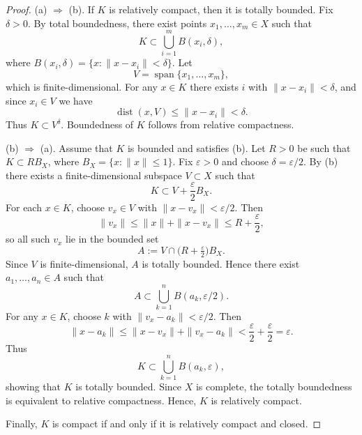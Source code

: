 \documentclass[12pt]{article}
\renewcommand{\(}{\left(}%
\renewcommand{\)}{\right)}%
\renewcommand{\[}{\left[}%
\renewcommand{\]}{\right]}%
\newtheorem{proof}{Proof.}}
\begin{document}
\begin{proof}
(a) $\Rightarrow$ (b).
If $K$ is relatively compact, then it is totally bounded.
Fix $\delta>0$. By total boundedness, there exist points
$x_1,\dots,x_m\in X$ such that
\begin{equation*}
  K \subset \bigcup_{i=1}^m B(x_i,\delta),
\end{equation*}
where $B(x_i,\delta)=\{x:\|x-x_i\|<\delta\}$.
Let
\begin{equation*}
  V = \operatorname{span}\{x_1,\dots,x_m\},
\end{equation*}
which is finite-dimensional.
For any $x\in K$ there exists $i$ with $\|x-x_i\|<\delta$, and since $x_i\in V$ we have
\begin{equation*}
  \operatorname{dist}(x,V)\le \|x-x_i\|<\delta.
\end{equation*}
Thus $K\subset V^\delta$. Boundedness of $K$ follows from relative compactness.

\medskip
(b) $\Rightarrow$ (a).
Assume that $K$ is bounded and satisfies (b).
Let $R>0$ be such that $K\subset RB_X$, where $B_X=\{x:\|x\|\le1\}$.
Fix $\varepsilon>0$ and choose $\delta=\varepsilon/2$.
By (b) there exists a finite-dimensional subspace $V\subset X$ such that
\begin{equation*}
  K \subset V + \frac{\varepsilon}{2}B_X.
\end{equation*}
For each $x\in K$, choose $v_x\in V$ with $\|x-v_x\|<\varepsilon/2$.
Then
\begin{equation*}
  \|v_x\|\le \|x\|+\|x-v_x\|\le R+\frac{\varepsilon}{2},
\end{equation*}
so all such $v_x$ lie in the bounded set
\begin{equation*}
  A := V\cap \bigl(R+\tfrac{\varepsilon}{2}\bigr)B_X.
\end{equation*}
Since $V$ is finite-dimensional, $A$ is totally bounded.
Hence there exist $a_1,\dots,a_n\in A$ such that
\begin{equation*}
  A \subset \bigcup_{k=1}^n B(a_k,\varepsilon/2).
\end{equation*}
For any $x\in K$, choose $k$ with $\|v_x-a_k\|<\varepsilon/2$.
Then
\begin{equation*}
  \|x-a_k\|\le \|x-v_x\|+\|v_x-a_k\|
  < \frac{\varepsilon}{2}+\frac{\varepsilon}{2}
  = \varepsilon.
\end{equation*}
Thus
\begin{equation*}
  K \subset \bigcup_{k=1}^n B(a_k,\varepsilon),
\end{equation*}
showing that $K$ is totally bounded.
Since $X$ is complete, the totally boundedness is equivalent to relative compactness. Hence, $K$ is relatively compact.

Finally, $K$ is compact if and only if it is relatively compact and closed.
\end{proof}
\end{document}
